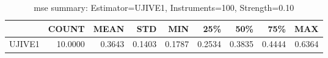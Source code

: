 \begin{table}[ht]
\centering
\caption{mse summary: Estimator=UJIVE1, Instruments=100, Strength=0.10}
\begin{tabular}{lrrrrrrrr}
\toprule
 & COUNT & MEAN & STD & MIN & 25\% & 50\% & 75\% & MAX \\
\midrule
UJIVE1 & 10.0000 & 0.3643 & 0.1403 & 0.1787 & 0.2534 & 0.3835 & 0.4444 & 0.6364 \\
\bottomrule
\end{tabular}
\end{table}
